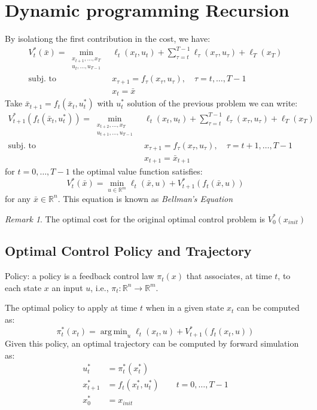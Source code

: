 \documentclass[openany]{book}
\DeclareMathOperator*{\argmin}{arg\,min}  %
\newcommand{\R}{\mathbb{R}}               %
\theoremstyle{definition}
\theoremstyle{remark}
\newtheorem*{remark}{Remark}
\begin{document}
\section{Dynamic programming Recursion}
By isolationg the first contribution in the cost, we have: 
\begin{align*}
    V_t^*(\bar{x})=  \min_{\substack{x_{t+1},\dots,x_T\\u_t,\dots,u_{T-1}}} & \ell_t(x_t,u_t) +  \displaystyle\sum_{\tau=t}^{T-1}\ell_\tau(x_\tau,u_\tau)+\ell_T(x_T)\\
                            \text{subj. to } & x_{\tau+1}=f_\tau(x_\tau,u_\tau), \quad \tau = t,\dots,T-1\\
                                             & x_t = \bar{x}
\end{align*}
Take $\bar{x}_{t+1} = f_t(\bar{x}_t,u_t^*)$ with $u_t^*$ solution of the previous problem we can write: 
\begin{align*}
    V_{t+1}^*(f_t(\bar{x}_t,u_t^*))=  \min_{\substack{x_{t+2},\dots,x_T\\u_{t+1},\dots,u_{T-1}}} & \ell_t(x_t,u_t) +  \displaystyle\sum_{\tau=t}^{T-1}\ell_\tau(x_\tau,u_\tau)+\ell_T(x_T)\\
                            \text{subj. to } & x_{\tau+1}=f_\tau(x_\tau,u_\tau), \quad \tau = t+1,\dots,T-1\\
                                             & x_{t+1} = \bar{x}_{t+1}
\end{align*}
for $t=0,\dots,T-1$ the optimal value function satisfies: 
\[
    V_t^*(\bar{x})=\min_{u\in\R^m}\ell_t(\bar{x},u)+V_{t+1}^*(f_t(\bar{x},u))
\]
for any $\bar{x}\in\R^n$. This equation is known as \emph{Bellman's Equation}
\begin{remark}
    The optimal cost for the original optimal control problem is $V_0^*(x_{init})$
\end{remark}

\subsection{Optimal Control Policy and Trajectory}
Policy: a policy is a feedback control law $\pi_t(x)$ that associates, at time $t$, to each state $x$ an input $u$, i.e., $\pi_t:\R^n\to\R^m$.

The optimal policy to apply at time $t$ when in a given state $x_t$ can be computed as: 
\[
    \pi_t^*(x_t) = \argmin_u \ell_t(x_t,u)+V_{t+1}^*(f_t(x_t,u))
\]
Given this policy, an optimal trajectory can be computed by forward simulation as: 
\begin{align*}
    u_t^* &= \pi_t^*(x_t^*)\\
    x_{t+1}^* &= f_t(x_t^*,u_t^*) \qquad t=0,\dots,T-1\\
    x_0^* &= x_{init}
\end{align*}
\end{document}
